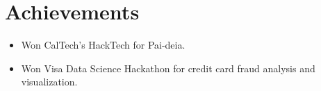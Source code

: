 \newcommand\textlcsc[1]{\textsc{\MakeTextLowercase{#1}}}
\section{Achievements}
\begin{itemize}
\setlength\itemsep{-7pt}
\item Won CalTech's HackTech for Pai-deia.
\item Won Visa Data Science Hackathon for credit card fraud analysis and visualization.
\end{itemize}

